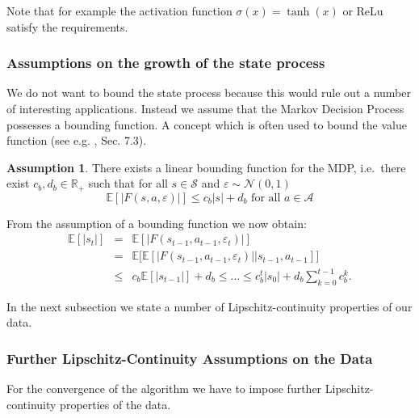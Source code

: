 \documentclass[reqno, 11pt]{amsart}%
\newcommand\cN{\mathcal N}
\newcommand\EE{\mathbb E}
\newcommand\RR{\mathbb R}
\theoremstyle{definition}
\newtheorem{assumption}{Assumption}  %
\begin{document}
Note that for example the activation function $\sigma(x)=\tanh(x)$ or ReLu satisfy the requirements. 

\subsubsection{Assumptions on the growth of the state process}
We do not want to bound the state process because this would rule out a number of interesting applications. Instead we assume that the Markov Decision Process possesses a bounding function. A concept which is often used to bound the value function (see e.g. \cite{BauerleRieder}, Sec. 7.3).

\begin{assumption}
	\label{as:2} There exists a linear bounding function  for the MDP, i.e.\ there exist $c_b,d_b\in\RR_+$ such that for all $s\in \mathcal{S}$ and $\varepsilon \sim \cN(0,1)$
 $$\EE\left[|F(s,a,\varepsilon)| \right] \le c_b |s| + d_b \mbox{ for all } a\in \mathcal{A}$$
\end{assumption}

From the assumption of a bounding function we now obtain:
\begin{eqnarray*}
    \EE[|s_t|] &=& \EE\left[ |F(s_{t-1},a_{t-1},\varepsilon_{t})| \right] \\
    &=&  \EE\big[\EE\left[ |F(s_{t-1},a_{t-1},\varepsilon_t)|| s_{t-1},a_{t-1}\right]\big]\\
    &\le & c_b \EE[|s_{t-1}|] + d_b\le \ldots \le  c_b^t |s_0|+ d_b \sum_{k=0}^{t-1}c_b^k.
\end{eqnarray*}

In the next subsection we state a number of Lipschitz-continuity properties of our data. 

\subsubsection{Further Lipschitz-Continuity Assumptions on the Data}
For the convergence of the algorithm we have to impose further Lipschitz-continuity properties of the data.
\end{document}
